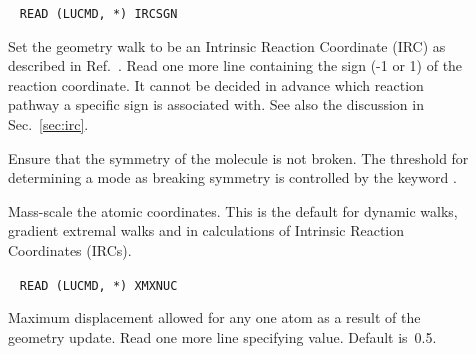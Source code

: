 \begin{description}
\item[]\verb| |\newline
\verb|READ (LUCMD, *) IRCSGN|

Set the geometry walk to be  an
Intrinsic Reaction Coordinate (IRC) as described in
Ref.~\cite{kfacr14}. Read one
more line containing the sign (-1 or 1) of the reaction coordinate. It
cannot be decided in advance which reaction pathway a specific sign is
associated with. See also the discussion in Sec.~\ref{sec:irc}.

%

\item[] Ensure that the symmetry of the molecule is not
broken. The threshold for determining a mode as breaking symmetry is
controlled by the keyword .

\item[] Mass-scale the atomic
coordinates.  This is the
default for dynamic walks, gradient
extremal walks and in calculations
of Intrinsic Reaction Coordinates
(IRCs).

\item[]\verb| |\newline
\verb|READ (LUCMD, *) XMXNUC|

Maximum displacement allowed for any one
atom as a result of the geometry update.  Read one more line
specifying value.  Default is~0.5.


\end{description}
